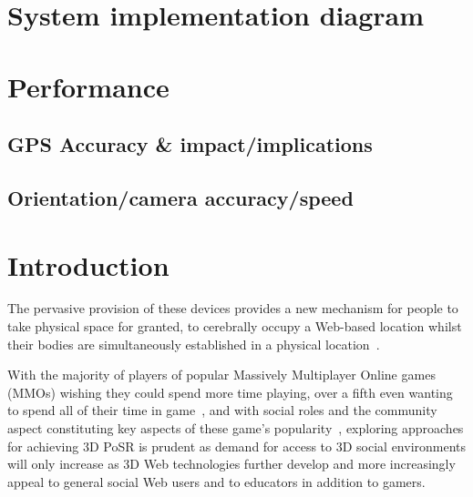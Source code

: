 \section{System implementation diagram}

\section{Performance}

\subsection{GPS Accuracy \& impact/implications}

\subsection{Orientation/camera accuracy/speed}

\section{Introduction}
The pervasive provision of these devices provides a new mechanism for people to take physical space for granted, to cerebrally occupy a Web-based location whilst their bodies are simultaneously established in a physical location~\cite{Applin2011}.

With the majority of players of popular Massively Multiplayer Online games (MMOs) wishing they could spend more time playing, over a fifth even wanting to spend all of their time in game~\cite{Castronova2006}, and with social roles and the community aspect constituting key aspects of these game's popularity~\cite{Castronova2006, Bartle2004}, exploring approaches for achieving 3D PoSR is prudent as demand for access to 3D social environments will only increase as 3D Web technologies further develop and more increasingly appeal to general social Web users and to educators in addition to gamers.

